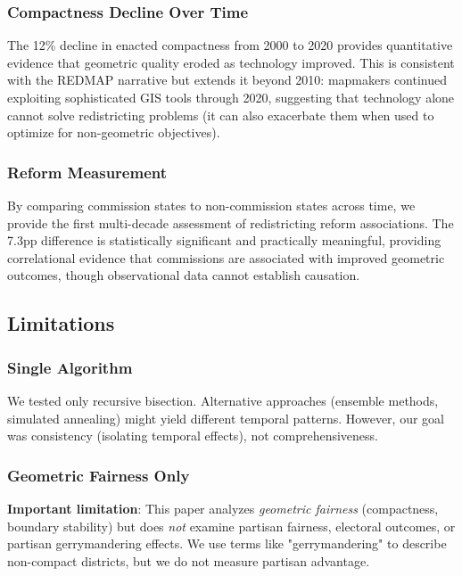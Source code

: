 \subsubsection{Compactness Decline Over Time}

The 12\% decline in enacted compactness from 2000 to 2020 provides quantitative evidence that geometric quality eroded as technology improved. This is consistent with the REDMAP narrative but extends it beyond 2010: mapmakers continued exploiting sophisticated GIS tools through 2020, suggesting that technology alone cannot solve redistricting problems (it can also exacerbate them when used to optimize for non-geometric objectives).

\subsubsection{Reform Measurement}

By comparing commission states to non-commission states across time, we provide the first multi-decade assessment of redistricting reform associations. The 7.3pp difference is statistically significant and practically meaningful, providing correlational evidence that commissions are associated with improved geometric outcomes, though observational data cannot establish causation.

\subsection{Limitations}

\subsubsection{Single Algorithm}

We tested only recursive bisection. Alternative approaches (ensemble methods, simulated annealing) might yield different temporal patterns. However, our goal was consistency (isolating temporal effects), not comprehensiveness.

\subsubsection{Geometric Fairness Only}

\textbf{Important limitation}: This paper analyzes \textit{geometric fairness} (compactness, boundary stability) but does \textit{not} examine partisan fairness, electoral outcomes, or partisan gerrymandering effects. We use terms like "gerrymandering" to describe non-compact districts, but we do not measure partisan advantage.

